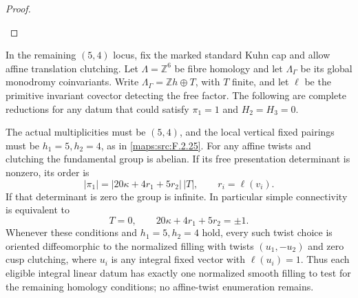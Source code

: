 \begin{proof}
\begin{enumerate}[label=\arabic*.]
\end{enumerate}
\end{proof}




\begin{theorem}\label{maps:src:F.2.28}


In the remaining $(5,4)$ locus, fix the marked standard Kuhn
cap and allow affine translation clutching.
Let $\Lambda=\mathbb Z^6$ be fibre homology and let
$\Lambda_\Gamma$ be its global monodromy coinvariants.
Write $\Lambda_\Gamma=\mathbb Zh\oplus T$, with $T$ finite,
and let $\ell$ be the primitive invariant covector detecting
the free factor.  The following are complete reductions for
any datum that could satisfy $\pi_1=1$ and $H_2=H_3=0$.

The actual multiplicities must be $(5,4)$, and the local
vertical fixed pairings must be $h_1=5,h_2=4$, as in \ref{maps:src:F.2.25}.
For any affine twists and clutching the fundamental group
is abelian.  If its free presentation determinant is nonzero,
its order is
\[
 |\pi_1|=|20\kappa+4r_1+5r_2|\,|T|,
 \qquad r_i=\ell(v_i).
 \tag{F.T11}\label{maps:eq:F.T11}
\]
If that determinant is zero the group is infinite.
In particular simple connectivity is equivalent to
\[
 T=0,\qquad 20\kappa+4r_1+5r_2=\pm1.
 \tag{F.T12}\label{maps:eq:F.T12}
\]
Whenever these conditions and $h_1=5,h_2=4$ hold, every
such twist choice is oriented diffeomorphic to the normalized
filling with twists $(u_1,-u_2)$ and zero cusp clutching,
where $u_i$ is any integral fixed vector with $\ell(u_i)=1$.
Thus each eligible integral linear datum has exactly one
normalized smooth filling to test for the remaining
homology conditions; no affine-twist enumeration remains.

\end{theorem}


